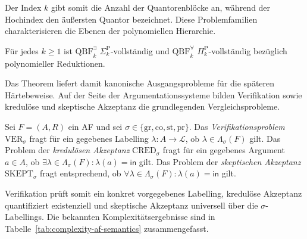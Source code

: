 Der Index \(k\) gibt somit die Anzahl der Quantorenblöcke an, während der
Hochindex den äußersten Quantor bezeichnet. Diese Problemfamilien
charakterisieren die Ebenen der polynomiellen Hierarchie.
\begin{Theorem}
    \label{thm:qbf-ph-completeness}
    Für jedes \(k\geq 1\) ist
    \(\mathrm{QBF}^{\exists}_k\)
    \(\Sigma_k^{\mathrm{P}}\)-vollständig und
    \(\mathrm{QBF}^{\forall}_k\)
    \(\Pi_k^{\mathrm{P}}\)-vollständig bezüglich polynomieller
    Reduktionen.
\end{Theorem}
Das Theorem liefert damit kanonische Ausgangsprobleme für die späteren
Härtebeweise. Auf der Seite der Argumentationssysteme bilden Verifikation
sowie kredulöse und skeptische Akzeptanz die grundlegenden
Vergleichsprobleme.
\begin{Definition}
    \label{def:standard-af-problems}
    Sei \(F=(A,R)\) ein AF und sei
    \(\sigma\in
    \{\mathrm{gr},\mathrm{co},\mathrm{st},\mathrm{pr}\}\).
    Das \emph{Verifikationsproblem}
    \(\mathrm{VER}_{\sigma}\) fragt für ein gegebenes Labelling
    \(\lambda\colon A\to\mathcal{L}\), ob
    \(\lambda\in\Lambda_{\sigma}(F)\) gilt.
    Das Problem der \emph{kredulösen Akzeptanz}
    \(\mathrm{CRED}_{\sigma}\) fragt für ein gegebenes Argument
    \(a\in A\), ob
    \(
        \exists\lambda\in\Lambda_{\sigma}(F)\colon
        \lambda(a)=\mathsf{in}
    \)
    gilt. 
    Das Problem der \emph{skeptischen Akzeptanz}
    \(\mathrm{SKEPT}_{\sigma}\) fragt entsprechend, ob
    \(
        \forall\lambda\in\Lambda_{\sigma}(F)\colon
        \lambda(a)=\mathsf{in}
    \)
    gilt.
\end{Definition}
Verifikation prüft somit ein konkret vorgegebenes Labelling, kredulöse
Akzeptanz quantifiziert existenziell und skeptische Akzeptanz universell
über die \(\sigma\)-Labellings. Die bekannten Komplexitätsergebnisse sind
in Tabelle~\ref{tab:complexity-af-semantics} zusammengefasst.

